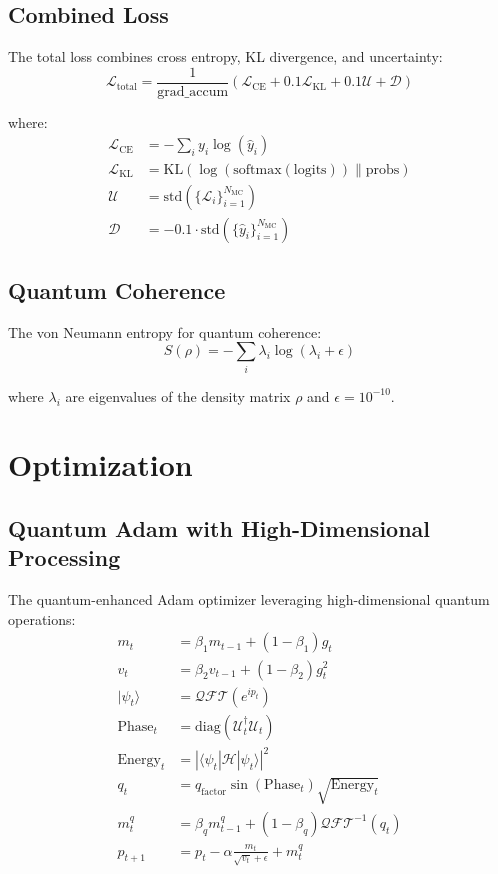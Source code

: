\documentclass{article}
\begin{document}
\subsection{Combined Loss}
The total loss combines cross entropy, KL divergence, and uncertainty:
\begin{equation}
\mathcal{L}_{\text{total}} = \frac{1}{\text{grad\_accum}}\left(\mathcal{L}_{\text{CE}} + 0.1\mathcal{L}_{\text{KL}} + 0.1\mathcal{U} + \mathcal{D}\right)
\end{equation}

where:
\begin{align*}
\mathcal{L}_{\text{CE}} &= -\sum_{i} y_i \log(\hat{y}_i) \\
\mathcal{L}_{\text{KL}} &= \text{KL}(\log(\text{softmax}(\text{logits})) \| \text{probs}) \\
\mathcal{U} &= \text{std}(\{\mathcal{L}_i\}_{i=1}^{N_{\text{MC}}}) \\
\mathcal{D} &= -0.1 \cdot \text{std}(\{\hat{y}_i\}_{i=1}^{N_{\text{MC}}})
\end{align*}

\subsection{Quantum Coherence}
The von Neumann entropy for quantum coherence:
\begin{equation}
S(\rho) = -\sum_i \lambda_i \log(\lambda_i + \epsilon)
\end{equation}

where $\lambda_i$ are eigenvalues of the density matrix $\rho$ and $\epsilon=10^{-10}$.

\section{Optimization}

\subsection{Quantum Adam with High-Dimensional Processing}
The quantum-enhanced Adam optimizer leveraging high-dimensional quantum operations:
\begin{align*}
m_t &= \beta_1 m_{t-1} + (1-\beta_1)g_t \\
v_t &= \beta_2 v_{t-1} + (1-\beta_2)g_t^2 \\
|\psi_t\rangle &= \mathcal{QFT}(e^{i p_t}) \\
\text{Phase}_t &= \text{diag}(\mathcal{U}_t^\dagger \mathcal{U}_t) \\
\text{Energy}_t &= |\langle\psi_t|\mathcal{H}|\psi_t\rangle|^2 \\
q_t &= q_{\text{factor}} \sin(\text{Phase}_t) \sqrt{\text{Energy}_t} \\
m^q_t &= \beta_q m^q_{t-1} + (1-\beta_q)\mathcal{QFT}^{-1}(q_t) \\
p_{t+1} &= p_t - \alpha\frac{m_t}{\sqrt{v_t} + \epsilon} + m^q_t
\end{align*}
\end{document}

